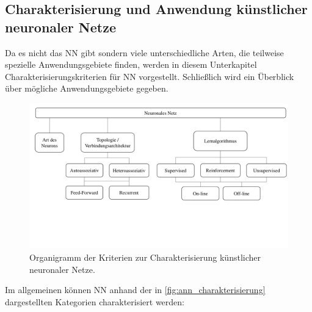 \subsection{Charakterisierung und Anwendung künstlicher neuronaler Netze}

Da es nicht das NN gibt sondern viele unterschiedliche Arten, die teilweise spezielle Anwendungsgebiete finden, werden in diesem Unterkapitel Charakterisierungskriterien für NN vorgestellt. Schließlich wird ein Überblick über mögliche Anwendungsgebiete gegeben.\\

\begin{figure}[!htb]
    \centering
        \includegraphics[page=1,width=1\textwidth,trim={.5cm 6cm 0 .6cm},clip]{Bilder/misc/ANN_Organigramme.pdf}
    \caption{Organigramm der Kriterien zur Charakterisierung künstlicher neuronaler Netze.}
    \label{fig:ann_charakterisierung}
\end{figure}


Im allgemeinen können NN anhand der in \autoref{fig:ann_charakterisierung} dargestellten Kategorien charakterisiert werden:%


